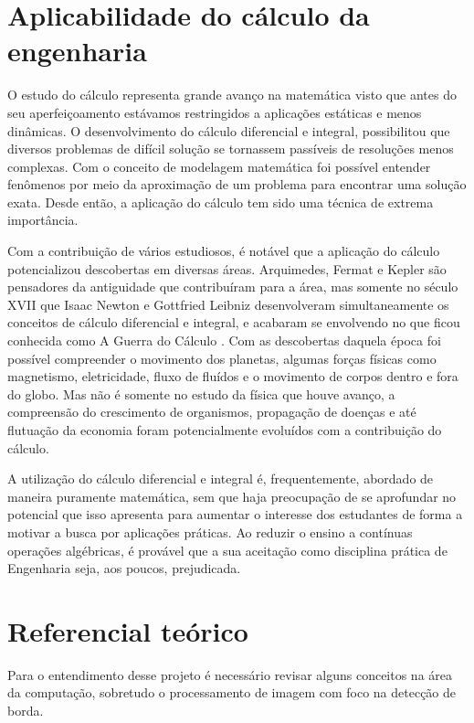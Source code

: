 \documentclass[12pt]{article}
\begin{document}
	\section{Aplicabilidade do cálculo da engenharia}
	
	O estudo do cálculo representa grande avanço na matemática visto que antes do seu aperfeiçoamento estávamos restringidos a aplicações estáticas e menos dinâmicas. O desenvolvimento do cálculo diferencial e integral, possibilitou que diversos problemas de difícil solução se tornassem passíveis de resoluções menos complexas. Com o conceito de modelagem matemática foi possível entender fenômenos por meio da aproximação de um problema para encontrar uma solução exata. Desde então, a aplicação do cálculo tem sido uma técnica de extrema importância.
	
	Com a contribuição de vários estudiosos, é notável que a aplicação do cálculo potencializou descobertas em diversas áreas. Arquimedes, Fermat e Kepler são pensadores da antiguidade que contribuíram para a área, mas somente no século XVII que Isaac Newton e Gottfried Leibniz desenvolveram simultaneamente os conceitos de cálculo diferencial e integral, e acabaram se envolvendo no que ficou conhecida como A Guerra do Cálculo \citep{gabriela}. Com as descobertas daquela época foi possível compreender o movimento dos planetas, algumas forças físicas como magnetismo, eletricidade, fluxo de fluídos e o movimento de corpos dentro e fora do globo. Mas não é somente no estudo da física que houve avanço, a compreensão do crescimento de organismos, propagação de doenças e até flutuação da economia foram potencialmente evoluídos com a contribuição do cálculo.
	
	A utilização do cálculo diferencial e integral é, frequentemente, abordado de maneira puramente matemática, sem que haja preocupação de se aprofundar no potencial que isso apresenta para aumentar o interesse dos estudantes de forma a motivar a busca por aplicações práticas. Ao reduzir o ensino a contínuas operações algébricas, é provável que a sua aceitação como disciplina prática de Engenharia seja, aos poucos, prejudicada.
	
	
	\section{Referencial teórico}
	
	Para o entendimento desse projeto é necessário revisar alguns conceitos na área da computação, sobretudo o processamento de imagem com foco na detecção de borda. 
	
\end{document}
